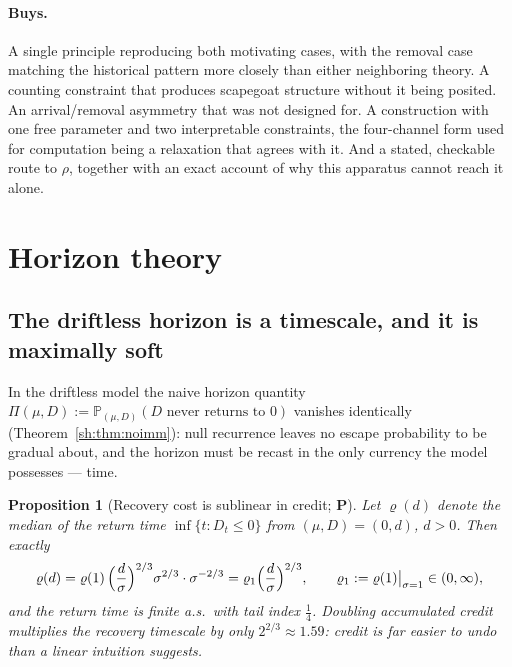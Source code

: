 \documentclass[11pt]{article}
\numberwithin{equation}{section}
\theoremstyle{plain}
\newtheorem{proposition}[theorem]{Proposition}
\theoremstyle{definition}
\theoremstyle{remark}
\newcommand{\PP}{\mathbb{P}}
\begin{document}
\paragraph{Buys.} A single principle reproducing both motivating cases,
with the removal case matching the historical pattern more closely than
either neighboring theory. A counting constraint that produces
scapegoat structure without it being posited. An arrival/removal
asymmetry that was not designed for. A construction with one free
parameter and two interpretable constraints, the four-channel form used
for computation being a relaxation that agrees with it. And a stated,
checkable route to $\rho$, together with an exact account of why this
apparatus cannot reach it alone.


\appendix

\section{Horizon theory}\label{app:horizon}

\label{sh:sub:horizon}

\subsection{The driftless horizon is a timescale, and it is maximally
soft}\label{sh:subsub:softhorizon}

In the driftless model the naive horizon quantity
$\Pi(\mu,D):=\PP_{(\mu,D)}(D\text{ never returns to }0)$ vanishes
identically (Theorem~\ref{sh:thm:noimm}): null recurrence leaves no escape
probability to be gradual about, and the horizon must be recast in the only
currency the model possesses --- time.

\begin{proposition}[Recovery cost is sublinear in credit; \textbf{P}]
\label{sh:prop:recovery}
Let $\varrho(d)$ denote the median of the return time
$\inf\{t:D_t\le0\}$ from $(\mu,D)=(0,d)$, $d>0$. Then exactly
\begin{equation}\label{sh:eq:recovery}
\varrho(d)=\varrho(1)\,\Bigl(\frac d\sigma\Bigr)^{2/3}\sigma^{2/3}\cdot
\sigma^{-2/3}=\varrho_1\Bigl(\frac d\sigma\Bigr)^{2/3},
\qquad \varrho_1:=\varrho(1)\big|_{\sigma=1}\in(0,\infty),
\end{equation}
and the return time is finite a.s.\ with tail index $\tfrac14$. Doubling
accumulated credit multiplies the recovery timescale by only
$2^{2/3}\approx1.59$: credit is far easier to undo than a linear intuition
suggests.
\end{proposition}
\end{document}
